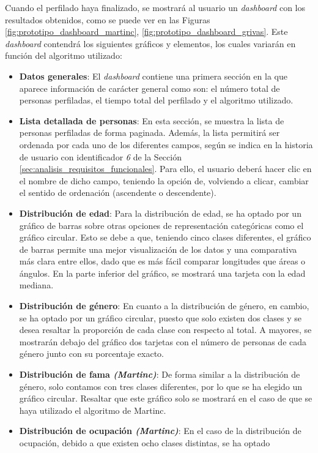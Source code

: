 \bigskip
Cuando el perfilado haya finalizado, se mostrará al usuario un \textit{dashboard} con los resultados obtenidos,
como se puede ver en las Figuras \ref{fig:prototipo_dashboard_martinc}, \ref{fig:prototipo_dashboard_grivas}. 
Este \textit{dashboard} contendrá los siguientes gráficos y elementos, los cuales variarán en función del algoritmo utilizado:

\begin{itemize}
	\item \textbf{Datos generales}: El \textit{dashboard} contiene una primera sección en la que aparece información de carácter general
		como son: el número total de personas perfiladas, el tiempo total del perfilado y el algoritmo utilizado.
	\item \textbf{Lista detallada de personas}: En esta sección, se muestra la lista de personas perfiladas de forma paginada. Además, la lista
		permitirá ser ordenada por cada uno de los diferentes campos, según se indica en la historia de usuario con identificador 
		\textit{6} de la Sección \ref{sec:analisis_requisitos_funcionales}. Para ello, el usuario deberá hacer clic en el nombre de dicho campo, teniendo
		la opción de, volviendo a clicar, cambiar el sentido de ordenación (ascendente o descendente).
	\item \textbf{Distribución de edad}: Para la distribución de edad, se ha optado por un gráfico de barras sobre otras opciones de representación
		categóricas como el gráfico circular. Esto se debe a que, teniendo cinco clases diferentes, el gráfico de barras permite una mejor visualización 
		de los datos y una comparativa más clara entre ellos, dado que es más fácil comparar longitudes que áreas o ángulos. En la parte inferior del gráfico,
		se mostrará una tarjeta con la edad mediana.
	\item \textbf{Distribución de género}: En cuanto a la distribución de género, en cambio, se ha optado por un gráfico circular, puesto que solo existen dos clases
		y se desea resaltar la proporción de cada clase con respecto al total. A mayores, se mostrarán debajo del gráfico dos tarjetas con el número de personas
		de cada género junto con su porcentaje exacto.
	\item \textbf{Distribución de fama \textit{(Martinc)}}: De forma similar a la distribución de género, solo contamos con tres clases diferentes, por lo que
		se ha elegido un gráfico circular. Resaltar que este gráfico solo se mostrará en el caso de que se haya utilizado el algoritmo de Martinc.
	\item \textbf{Distribución de ocupación \textit{(Martinc)}}: En el caso de la distribución de ocupación, debido a que existen ocho clases distintas, se ha optado

\end{itemize}
